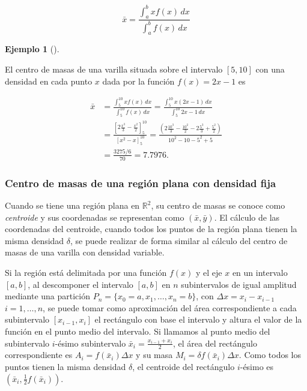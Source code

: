 \documentclass[
  a4paper,
]{scrreport}
\theoremstyle{plain}
\theoremstyle{definition}
\theoremstyle{plain}
\theoremstyle{plain}
\theoremstyle{definition}
\newtheorem{example}{Ejemplo}[chapter]
\theoremstyle{definition}
\theoremstyle{remark}
\begin{document}
\[
\bar x = \frac{\int_a^b xf(x)\,dx}{\int_a^b f(x)\,dx}
\]

\begin{example}[]\protect\hypertarget{exm-centro-masas}{}\label{exm-centro-masas}

El centro de masas de una varilla situada sobre el intervalo \([5, 10]\)
con una densidad en cada punto \(x\) dada por la función \(f(x)=2x-1\)
es

\begin{align*}
\bar x 
&= \frac{\int_5^{10} xf(x)\,dx}{\int_5^{10} f(x)\,dx} 
= \frac{\int_5^{10} x(2x-1)\,dx}{\int_5^{10} 2x-1\,dx} \\
&= \frac{\left[2\frac{x^3}{3}-\frac{x^2}{2}\right]_5^{10}}{[x^2-x]_5^{10}}
= \frac{\left(2\frac{10^3}{3}-\frac{10^2}{2}-2\frac{5^3}{3}+\frac{5^2}{2}\right)}{10^2-10-5^2+5} \\
&= \frac{3275/6}{70} 
= 7.7976.
\end{align*}

\end{example}

\subsubsection{Centro de masas de una región plana con densidad
fija}\label{sec-centro-masas-region-plana-densidad-constante}

Cuando se tiene una región plana en \(\mathbb{R}^2\), su centro de masas
se conoce como \emph{centroide} y sus coordenadas se representan como
\((\bar x, \bar y)\). El cálculo de las coordenadas del centroide,
cuando todos los puntos de la región plana tienen la misma densidad
\(\delta\), se puede realizar de forma similar al cálculo del centro de
masas de una varilla con densidad variable.

Si la región está delimitada por una función \(f(x)\) y el eje \(x\) en
un intervalo \([a,b]\), al descomponer el intervalo \([a,b]\) en \(n\)
subintervalos de igual amplitud mediante una partición
\(P_n=\{x_0=a, x_1, \ldots, x_n=b\}\), con \(\Delta x=x_i-x_{i-1}\)
\(i=1, \ldots, n\), se puede tomar como aproximación del área
correspondiente a cada subintervalo \([x_{i-1},x_i]\) el rectángulo con
base el intervalo y altura el valor de la función en el punto medio del
intervalo. Si llamamos al punto medio del subintervalo \(i\)-ésimo
subintervalo \(\bar x_i=\frac{x_{i-1}+x_i}{2}\), el área del rectángulo
correspondiente es \(A_i = f(\bar x_i)\Delta x\) y su masa
\(M_i = \delta f(\bar x_i)\Delta x\). Como todos los puntos tienen la
misma densidad \(\delta\), el centroide del rectángulo \(i\)-ésimo es
\((\bar x_i, \frac{1}{2}f(\bar x_i))\).
\end{document}
